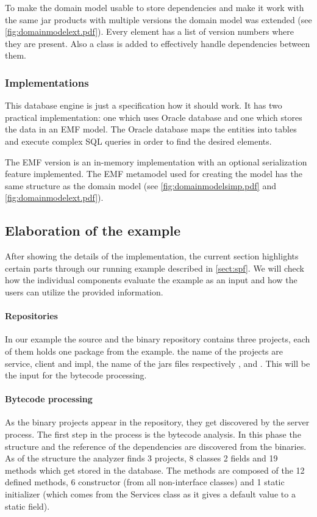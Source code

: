 To make the domain model usable to store dependencies and make it work with the
same jar products with multiple versions the domain model was extended (see
\autoref{fig:domainmodelext.pdf}).  Every element has a list of version numbers where they are
present. Also a  class is added to effectively handle
dependencies between them.

\subsubsection{Implementations}
This database engine is just a specification how it should work. It has two
practical implementation: one which uses Oracle database and one which stores
the data in an EMF model. The Oracle database maps the entities into tables and
execute complex SQL queries in order to find the desired elements.

The EMF version is an in-memory implementation with an optional serialization
feature implemented. The EMF metamodel used for creating the model has the same
structure as the domain model (see \autoref{fig:domainmodelsimp.pdf} and
\autoref{fig:domainmodelext.pdf}).



\subsection{Elaboration of the example}\label{sect:elabex1}
After showing the details of the implementation, the current section highlights
certain parts through our running example described in \autoref{sect:spf}.
We will check how the individual components evaluate the example as an input and
how the users can utilize the provided information.

\paragraph{Repositories}
In our example the source and the binary
repository contains three projects, each of them holds one package from the
example. the name of the projects are service, client and impl, the name of 
the jars files respectively ,  and . 
This will be the input for the bytecode processing.

\paragraph{Bytecode processing}
As 
the binary projects appear in the repository, they get discovered by the 
server process. 
The first step in the process is the bytecode analysis. In this phase the
structure and the reference of the dependencies are discovered from the
binaries. As of the structure the analyzer finds 3 projects, 8 classes 2 fields
and 19 methods which get stored in the database.
The methods are composed of the 12 defined methods, 6 constructor (from all
non-interface classes) and 1 static initializer (which comes from the Services
class as it gives a default value to a static field).

